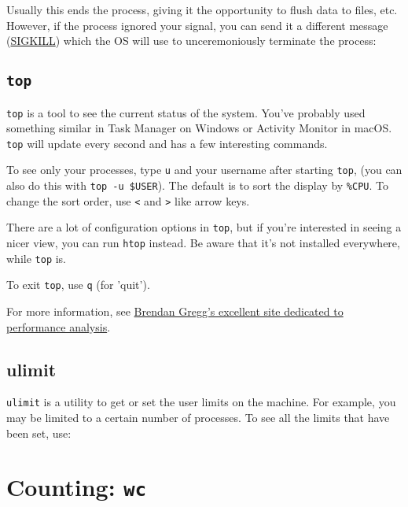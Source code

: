 Usually this ends the process, giving it the opportunity to flush data to files,
etc. However, if the process ignored your signal, you can send it a different
message (\href{https://en.wikipedia.org/wiki/Unix_signal#POSIX_signals}{SIGKILL}) which the OS
will use to unceremoniously terminate the process:

\begin{prompt}
\end{prompt}

\subsection{\texttt{top}}
\lstinline|top| is a tool to see the current status of the system. You've probably used
something similar in Task Manager on Windows or Activity Monitor in macOS. \lstinline|top|
will update every second and has a few interesting commands.

To see only your processes, type \lstinline|u| and your username after starting \lstinline|top|, (you can also do
this with \lstinline|top -u $USER|). The default is to sort the display by \lstinline|%CPU|.
To change the sort order, use \lstinline|<| and \lstinline|>| like arrow keys.

There are a lot of configuration options in \lstinline|top|, but if you're interested in
seeing a nicer view, you can run \lstinline|htop| instead. Be aware that it's not
installed everywhere, while \lstinline|top| is.

To exit \lstinline|top|, use \lstinline|q| (for 'quit').

For more information, see \href{http://brendangregg.com}{Brendan Gregg's excellent
site dedicated to performance analysis}.

\subsection{ulimit}
\lstinline|ulimit| is a utility to get or set the user limits on the machine. For
example, you may be limited to a certain number of processes. To see all the
limits that have been set, use:

\begin{prompt}
\end{prompt}

\section{Counting: \texttt{wc}}

